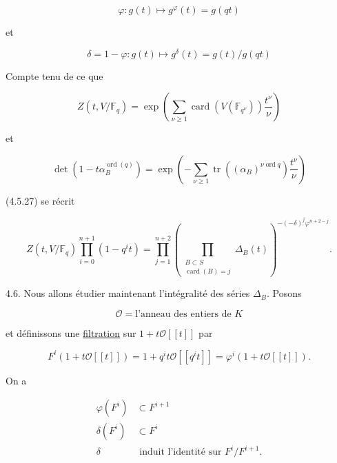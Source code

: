 \begin{equation}\tag{4.5.29}
\varphi:g(t)\longmapsto g^\varphi(t)=g(qt)
\end{equation}

et

\begin{equation}\tag{4.5.30}
\delta=1-\varphi:g(t)\longmapsto
g^\delta(t)=g(t)/g(qt)
\end{equation}


Compte tenu de ce que

\begin{equation}\tag{4.5.31}
Z(t,V/\mathbb F_q)
=\exp\!\left(
\sum_{\nu\geq1}\operatorname{card}(V(\mathbb F_{q^\nu}))
\frac{t^\nu}{\nu}\right)
\end{equation}

et

\begin{equation}\tag{4.5.32}
\det\!\left(1-t\alpha_B^{\operatorname{ord}(q)}\right)
=\exp\!\left(
-\sum_{\nu\geq1}
\operatorname{tr}\!\left((\alpha_B)^{\nu\operatorname{ord}q}\right)
\frac{t^\nu}{\nu}\right)
\end{equation}

(4.5.27) se récrit

\begin{equation}\tag{4.5.23}
Z(t,V/\mathbb F_q)\prod_{i=0}^{n+1}(1-q^it)
=\prod_{j=1}^{n+2}
\left(
\prod_{\substack{B\subset S\\\operatorname{card}(B)=j}}
\Delta_B(t)
\right)^{-(-\delta)^j\varphi^{n+2-j}}.
\end{equation}

4.6. Nous allons étudier maintenant l'intégralité des séries $\Delta_B$.
Posons

\begin{equation}\tag{4.6.1}
\mathcal O=\text{l'anneau des entiers de $K$}
\end{equation}

et définissons une \underline{filtration} sur $1+t\mathcal O[[t]]$ par

\begin{equation}\tag{4.6.2}
F^i(1+t\mathcal O[[t]])
=1+q^it\mathcal O[[q^it]]
=\varphi^i(1+t\mathcal O[[t]]).
\end{equation}

On a

\begin{align}
\varphi(F^i)&\subset F^{i+1} \tag{4.6.3}\\
\delta(F^i)&\subset F^i \tag{4.6.4}\\
\delta&\text{ induit l'identité sur }F^i/F^{i+1}. \tag{4.6.5}
\end{align}

